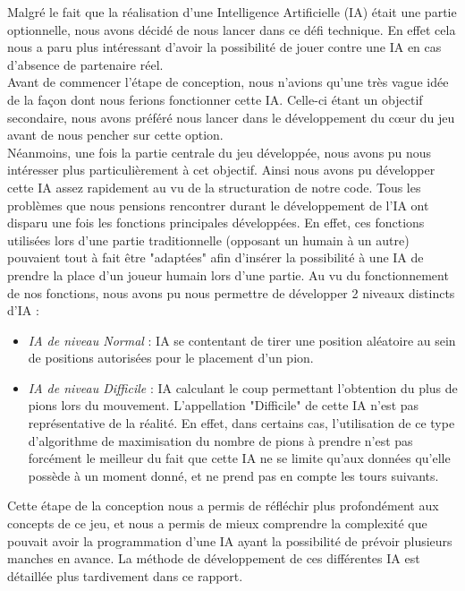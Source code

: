 Malgré le fait que la réalisation d'une Intelligence Artificielle (IA) était une partie optionnelle, nous avons décidé de nous lancer dans ce défi technique. En effet cela nous a paru plus intéressant d'avoir la possibilité de jouer contre une IA en cas d'absence de partenaire réel.
\\Avant de commencer l'étape de conception, nous n'avions qu'une très vague idée de la façon dont nous ferions fonctionner cette IA. Celle-ci étant un objectif secondaire, nous avons préféré nous lancer dans le développement du cœur du jeu avant de nous pencher sur cette option.
\\Néanmoins, une fois la partie centrale du jeu développée, nous avons pu nous intéresser plus particulièrement à cet objectif. Ainsi nous avons pu développer cette IA assez rapidement au vu de la structuration de notre code. Tous les problèmes que nous pensions rencontrer durant le développement de l'IA ont disparu une fois les fonctions principales développées. En effet, ces fonctions utilisées lors d'une partie traditionnelle (opposant un humain à un autre) pouvaient tout à fait être "adaptées" afin d'insérer la possibilité à une IA de prendre la place d'un joueur humain lors d'une partie.
\newpage
Au vu du fonctionnement de nos fonctions, nous avons pu nous permettre de développer 2 niveaux distincts d'IA :
\begin{itemize}
	\item \emph{IA de niveau Normal} : IA se contentant de tirer une position aléatoire au sein de positions autorisées pour le placement d'un pion.
	\item \emph{IA de niveau Difficile} : IA calculant le coup permettant l'obtention du plus de pions lors du mouvement. L'appellation "Difficile" de cette IA n'est pas représentative de la réalité. En effet, dans certains cas, l'utilisation de ce type d'algorithme de maximisation du nombre de pions à prendre n'est pas forcément le meilleur du fait que cette IA ne se limite qu'aux données qu'elle possède à un moment donné, et ne prend pas en compte les tours suivants.
\end{itemize}

Cette étape de la conception nous a permis de réfléchir plus profondément aux concepts de ce jeu, et nous a permis de mieux comprendre la complexité que pouvait avoir la programmation d'une IA ayant la possibilité de prévoir plusieurs manches en avance. La méthode de développement de ces différentes IA est détaillée plus tardivement dans ce rapport.

